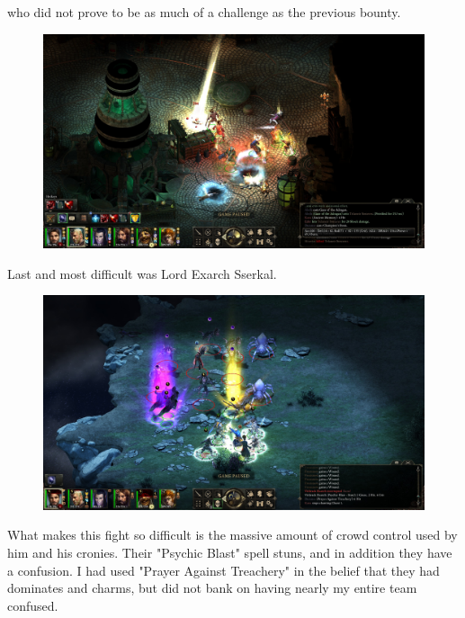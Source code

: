 \documentclass{article}
\begin{document}
who did not prove to be as much of a challenge as the previous bounty.

\begin{figure}
\includegraphics[scale=0.33]{files/blog/2019_03_04_pillars_of_eternity_path_of_the_damned_act_iii/2019_03_04_ysly2.jpg}
\end{figure}

Last and most difficult was Lord Exarch Sserkal.

\begin{figure}
\includegraphics[scale=0.33]{files/blog/2019_03_04_pillars_of_eternity_path_of_the_damned_act_iii/2019_03_04_sserkal1.jpg}
\end{figure}

What makes this fight so difficult is the massive amount of crowd control used by him and his cronies.  Their "Psychic Blast" spell stuns, and in addition they have a confusion.  I had used "Prayer Against Treachery" in the belief that they had dominates and charms, but did not bank on having nearly my entire team confused.
\end{document}
